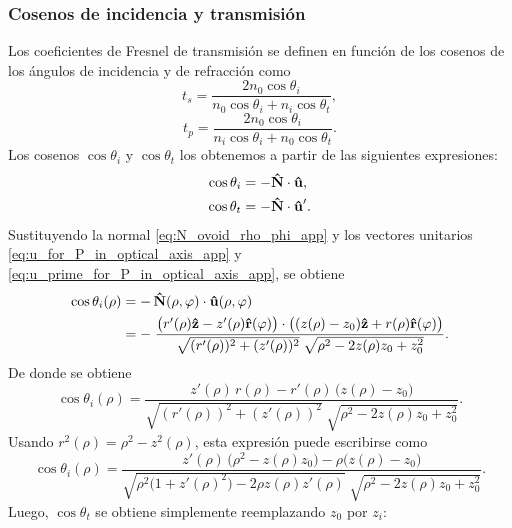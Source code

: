 \subsubsection{Cosenos de incidencia y transmisión}

Los coeficientes de Fresnel de transmisión se definen en función de los cosenos de los ángulos de incidencia y de refracción como
\begin{equation}
t_s
=
\frac{2 n_0 \cos \theta_i}
{n_0 \cos \theta_i + n_i \cos \theta_t},
\label{eq:ts_app}
\end{equation}
\begin{equation}
t_p
=
\frac{2 n_0 \cos \theta_i}
{n_i \cos \theta_i + n_0 \cos \theta_t}.
\label{eq:tp_app}
\end{equation}
Los cosenos $\cos\theta_i$ y $\cos\theta_t$ los obtenemos a partir de las siguientes expresiones:
\begin{align}
  \cos\theta_i &= -\bm{\hat{\mathbf{N}}} \cdot \bm{\hat{\mathbf{u}}},
  \\
  \cos\theta_t &= -\bm{\hat{\mathbf{N}}} \cdot \bm{\hat{\mathbf{u}}}'.
\end{align}
Sustituyendo la normal \eqref{eq:N_ovoid_rho_phi_app} y los vectores unitarios \eqref{eq:u_for_P_in_optical_axis_app} y \eqref{eq:u_prime_for_P_in_optical_axis_app}, se obtiene
\begin{align}
\cos\theta_i(\rho)
&=
-\,\bm{\hat{\mathbf{N}}}(\rho,\varphi)\cdot\bm{\hat{\mathbf{u}}}(\rho,\varphi)
\label{eq:cos_theta_i_def_app}
\\
&=
-\;
\frac{
\big(r'(\rho)\bm{\hat{\mathbf{z}}}-z'(\rho)\bm{\hat{\mathbf{r}}}(\varphi)\big)
\cdot
\big((z(\rho)-z_0)\bm{\hat{\mathbf{z}}}+r(\rho)\bm{\hat{\mathbf{r}}}(\varphi)\big)
}
{
\sqrt{(r'(\rho))^2+(z'(\rho))^2}\;
\sqrt{\rho^2-2z(\rho)z_0+z_0^2}
}.
\label{eq:cos_theta_i_closed_app}
\end{align}
De donde se obtiene
\begin{equation}
  \cos\theta_i(\rho)
  =
  \frac{
  z'(\rho)\,r(\rho)
  -
  r'(\rho)\,\big(z(\rho)-z_0\big)
  }
  {
  \sqrt{(r'(\rho))^2+(z'(\rho))^2}\;
  \sqrt{\rho^2-2z(\rho)z_0+z_0^2}
  }.
  \label{eq:cos_theta_i_ovoid_z_and_r}
\end{equation}
Usando $r^2(\rho)=\rho^2-z^2(\rho)$, esta expresión puede escribirse como
\begin{equation}
\cos\theta_i(\rho)
=
\frac{
z'(\rho)\,\big(\rho^2-z(\rho)z_0\big)
-
\rho\big(z(\rho)-z_0\big)
}
{
\sqrt{\rho^2\big(1+z'(\rho)^2\big)-2\rho z(\rho)z'(\rho)}
\;
\sqrt{\rho^2-2z(\rho)z_0+z_0^2}
}.
\label{eq:cos_theta_i_ovoid}
\end{equation}
Luego, $\cos\theta_t$ se obtiene simplemente reemplazando $z_0$ por $z_i$:
